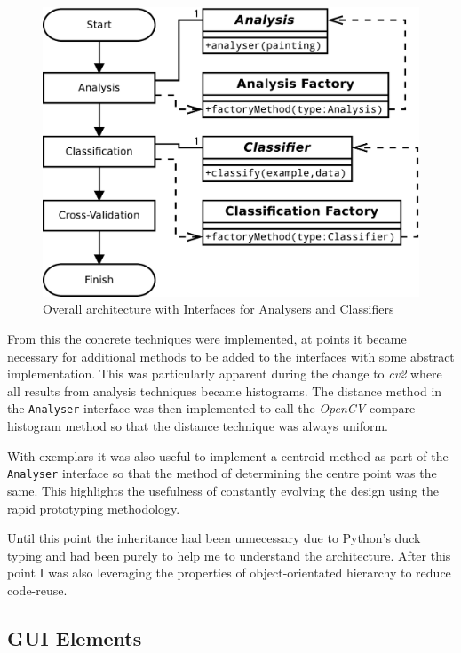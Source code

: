 \begin{figure}[h]
\centering
\includegraphics[width=\linewidth]{img/interfaces-arch}
\caption{Overall architecture with Interfaces for Analysers and Classifiers}\label{fig:interfaces-arch}
\end{figure}

From this the concrete techniques were implemented, at points it became necessary for additional 
methods to be added to the interfaces with some abstract implementation. This was particularly
apparent during the change to \emph{cv2} where all results from analysis techniques became 
histograms. The distance method in the \texttt{Analyser} interface was then implemented to call
the \emph{OpenCV} compare histogram method so that the distance technique was always uniform.

With exemplars it was also useful to implement a centroid method as part of the \texttt{Analyser}
interface so that the method of determining the centre point was the same. This highlights the 
usefulness of constantly evolving the design using the rapid prototyping methodology.

Until this point the inheritance had been unnecessary due to Python's duck typing and had been
purely to help me to understand the architecture. After this point I was also leveraging the 
properties of object-orientated hierarchy to reduce code-reuse.

\subsection{GUI Elements}

